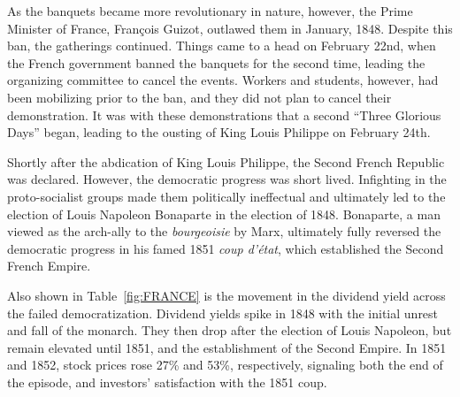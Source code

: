As the banquets became more revolutionary in nature,  however, the Prime Minister of France, Fran\c{c}ois Guizot, outlawed them in January, 1848. Despite this ban, the gatherings continued. Things came to a head on February 22nd, when the French government banned the banquets for the second time, leading the organizing committee to cancel the events. Workers and students, however, had been mobilizing prior to the ban, and they did not plan to cancel their demonstration. It was with these demonstrations that a second ``Three Glorious Days'' began, leading to the ousting of King Louis Philippe on February 24th.

Shortly after the abdication of King Louis Philippe, the Second French Republic was declared. However, the democratic progress was short lived. Infighting in the proto-socialist groups made them politically ineffectual and ultimately led to the election of Louis Napoleon Bonaparte in the election of 1848. Bonaparte, a man viewed as the arch-ally to the \textit{bourgeoisie} by Marx, ultimately fully reversed the democratic progress in his famed 1851 \textit{coup d'\'{e}tat}, which established the Second French Empire.

Also shown in Table~\ref{fig:FRANCE} is the movement in the dividend yield across the failed democratization. Dividend yields spike in 1848 with the initial unrest and fall of the monarch. They then drop after the election of Louis Napoleon, but remain elevated until 1851, and the establishment of the Second Empire. In 1851 and 1852, stock prices rose 27\% and 53\%, respectively, signaling both the end of the episode, and investors' satisfaction with the 1851 coup.


